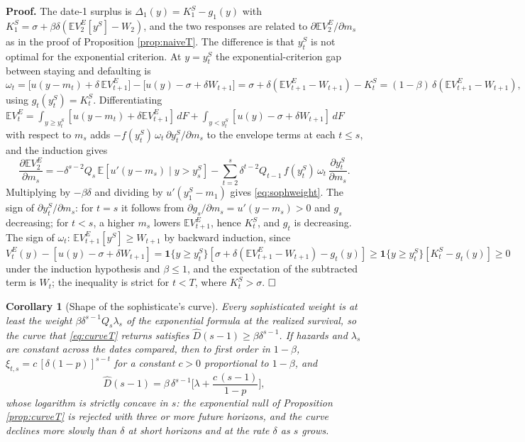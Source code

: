 \documentclass[12pt,english]{article}
\newtheorem{corollary}[theorem]{Corollary}
\begin{document}
\noindent\textbf{Proof.} The date-1 surplus is $\Delta_1(y) = K^S_1 - g_1(y)$ with $K^S_1 = \sigma + \beta\delta(\mathbb{E}V^E_2[y^S] - W_2)$, and the two responses are related to $\partial\mathbb{E}V^E_2/\partial m_s$ as in the proof of Proposition \ref{prop:naiveT}. The difference is that $y^S_t$ is not optimal for the exponential criterion. At $y = y^S_t$ the exponential-criterion gap between staying and defaulting is
\[
\omega_t = \big[u(y - m_t) + \delta\,\mathbb{E}V^E_{t+1}\big] - \big[u(y) - \sigma + \delta W_{t+1}\big] = \sigma + \delta(\mathbb{E}V^E_{t+1} - W_{t+1}) - K^S_t = (1-\beta)\,\delta(\mathbb{E}V^E_{t+1} - W_{t+1}),
\]
using $g_t(y^S_t) = K^S_t$. Differentiating $\mathbb{E}V^E_t = \int_{y \ge y^S_t}[u(y - m_t) + \delta\mathbb{E}V^E_{t+1}]\,dF + \int_{y < y^S_t}[u(y) - \sigma + \delta W_{t+1}]\,dF$ with respect to $m_s$ adds $-f(y^S_t)\,\omega_t\,\partial y^S_t/\partial m_s$ to the envelope terms at each $t \le s$, and the induction gives
\[
\frac{\partial\mathbb{E}V^E_2}{\partial m_s} = -\delta^{s-2}Q_s\,\mathbb{E}[u'(y - m_s) \mid y > y^S_s] - \sum_{t=2}^{s}\delta^{t-2}Q_{t-1}\,f(y^S_t)\,\omega_t\,\frac{\partial y^S_t}{\partial m_s} .
\]
Multiplying by $-\beta\delta$ and dividing by $u'(y^S_1 - m_1)$ gives \eqref{eq:sophweight}. The sign of $\partial y^S_t/\partial m_s$: for $t = s$ it follows from $\partial g_s/\partial m_s = u'(y - m_s) > 0$ and $g_s$ decreasing; for $t < s$, a higher $m_s$ lowers $\mathbb{E}V^E_{t+1}$, hence $K^S_t$, and $g_t$ is decreasing. The sign of $\omega_t$: $\mathbb{E}V^E_{t+1}[y^S] \ge W_{t+1}$ by backward induction, since $V^E_t(y) - [u(y) - \sigma + \delta W_{t+1}] = \mathbf{1}\{y \ge y^S_t\}[\sigma + \delta(\mathbb{E}V^E_{t+1} - W_{t+1}) - g_t(y)] \ge \mathbf{1}\{y \ge y^S_t\}[K^S_t - g_t(y)] \ge 0$ under the induction hypothesis and $\beta \le 1$, and the expectation of the subtracted term is $W_t$; the inequality is strict for $t < T$, where $K^S_t > \sigma$. $\hfill\square$

\begin{corollary}[Shape of the sophisticate's curve]\label{cor:sophshape}
Every sophisticated weight is at least the weight $\beta\delta^{s-1}Q_s\lambda_s$ of the exponential formula at the realized survival, so the curve that \eqref{eq:curveT} returns satisfies $\hat D(s-1) \ge \beta\delta^{s-1}$. If hazards and $\lambda_s$ are constant across the dates compared, then to first order in $1-\beta$, $\xi_{t,s} = c\,[\delta(1-p)]^{s-t}$ for a constant $c > 0$ proportional to $1-\beta$, and
\[
\hat D(s-1) = \beta\,\delta^{s-1}\Big[\lambda + \frac{c\,(s-1)}{1-p}\Big] ,
\]
whose logarithm is strictly concave in $s$: the exponential null of Proposition \ref{prop:curveT} is rejected with three or more future horizons, and the curve declines more slowly than $\delta$ at short horizons and at the rate $\delta$ as $s$ grows.
\end{corollary}
\end{document}
